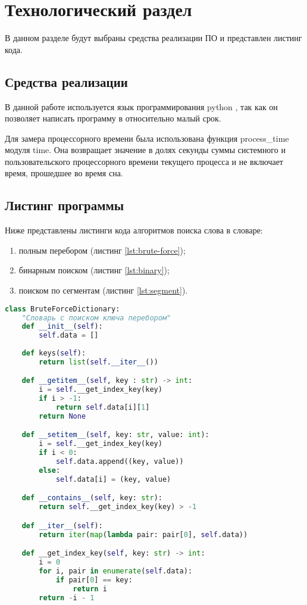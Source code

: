 \chapter{ Технологический раздел}
\label{cha:technological}

    В данном разделе будут выбраны средства реализации ПО и представлен листинг кода. 

    \section{Средства реализации}
        В данной работе используется язык программирования python \cite{c-sharp}, так как
        он позволяет написать программу в относительно малый срок.

        Для замера процессорного времени была использована функция process\_time модуля time.
        Она возвращает значение в долях секунды суммы системного и пользовательского процессорного времени текущего процесса и 
        не включает время, прошедшее во время сна.

    \section{Листинг программы}
        Ниже представлены листинги кода алгоритмов поиска слова в словаре:
        \begin{enumerate}
            \item полным перебором (листинг \ref{lst:brute-force});
            \item бинарным поиском (листинг \ref{lst:binary});
            \item поиском по сегментам (листинг \ref{lst:segment}).
        \end{enumerate}
        
        \begin{lstlisting}[language=python, label=lst:brute-force, caption=Реализация алгоритма поиска слов в словаре полным перебором]
class BruteForceDictionary:
    "Словарь с поиском ключа перебором"
    def __init__(self):
        self.data = []
    
    def keys(self):
        return list(self.__iter__())

    def __getitem__(self, key : str) -> int:
        i = self.__get_index_key(key)
        if i > -1:
            return self.data[i][1]
        return None

    def __setitem__(self, key: str, value: int):
        i = self.__get_index_key(key)
        if i < 0:
            self.data.append((key, value))
        else:
            self.data[i] = (key, value)

    def __contains__(self, key: str):
        return self.__get_index_key(key) > -1

    def __iter__(self):
        return iter(map(lambda pair: pair[0], self.data))

    def __get_index_key(self, key: str) -> int:
        i = 0
        for i, pair in enumerate(self.data):
            if pair[0] == key:
                return i
        return -i - 1
        \end{lstlisting}


